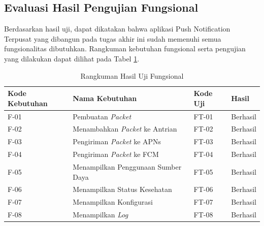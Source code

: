 \subsection{Evaluasi Hasil Pengujian Fungsional}
\par Berdasarkan hasil uji, dapat dikatakan bahwa aplikasi Push Notification Terpusat yang dibangun pada tugas akhir ini sudah memenuhi semua fungsionalitas dibutuhkan. Rangkuman kebutuhan fungsional serta pengujian yang dilakukan dapat dilihat pada Tabel \ref{t:eval_f}.
\begin{longtable}{|p{1.5cm}|p{3.5cm}|p{1.5cm}|p{1.5cm}|}
	\caption{Rangkuman Hasil Uji Fungsional} \label{t:eval_f} \\ \hline
	\rowcolor{lightgray} Kode Kebutuhan & Nama Kebutuhan & Kode Uji & Hasil \\ \hline
	\endhead
	F-01 & Pembuatan \textit{Packet} & FT-01 & Berhasil \\ \hline
	F-02 & Menambahkan \textit{Packet} ke Antrian & FT-02 & Berhasil \\ \hline
	F-03 & Pengiriman \textit{Packet} ke APNs & FT-03 & Berhasil \\ \hline
	F-04 & Pengiriman \textit{Packet} ke FCM & FT-04 & Berhasil \\ \hline
	F-05 & Menampilkan Penggunaan Sumber Daya & FT-05 & Berhasil \\ \hline
	F-06 & Menampilkan Status Kesehatan & FT-06 & Berhasil \\ \hline
	F-07 & Menampilkan Konfigurasi & FT-07 & Berhasil \\ \hline
	F-08 & Menampilkan \textit{Log} & FT-08 & Berhasil \\ \hline
\end{longtable}

